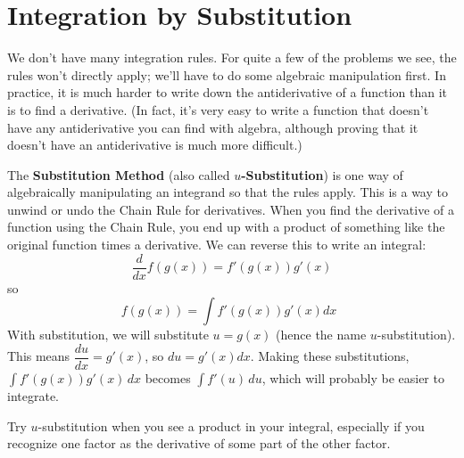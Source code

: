 \section{Integration by Substitution}
\label{sec:substitution}
We don't have many integration rules. For quite a few of the problems we see, the rules won't directly apply; we'll have to do some algebraic manipulation first. In practice, it is much harder to write down the antiderivative of a function than it is to find a derivative. (In fact, it's very easy to write a function that doesn't have any antiderivative you can find with algebra, although proving that it doesn't have an antiderivative is much more difficult.)

The {\bf Substitution Method} (also called $u${\bf-Substitution}) is one way of algebraically manipulating an integrand so that the rules apply. This is a way to unwind or undo the Chain Rule for derivatives. When you find the derivative of a function using the Chain Rule, you end up with a product of something like the original function times a derivative. We can reverse this to write an integral:
$$\dfrac{d}{dx}f(g(x))=f'(g(x))g'(x)$$
so
$$f(g(x))=\int f'(g(x))g'(x)dx \enspace $$
With substitution, we will substitute $u=g(x)$ (hence the name $u$-substitution). This means $\dfrac{du}{dx}=g'(x)$, so $du=g'(x)dx$. Making these substitutions, $\displaystyle\int f'(g(x))g'(x)\,dx$ becomes $\displaystyle\int f'(u)\,du$, which will probably be easier to integrate.

Try $u$-substitution when you see a product in your integral, especially if you recognize one factor as the derivative of some part of the other factor.

